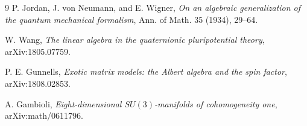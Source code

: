 \documentclass[11pt]{article}
\theoremstyle{definition}
\theoremstyle{remark}
\begin{document}
\begin{thebibliography}{9}
P. Jordan, J. von Neumann, and E. Wigner,
\emph{On an algebraic generalization of the quantum mechanical formalism},
Ann. of Math. 35 (1934), 29--64.

W. Wang,
\emph{The linear algebra in the quaternionic pluripotential theory},
arXiv:1805.07759.

P. E. Gunnells,
\emph{Exotic matrix models: the Albert algebra and the spin factor},
arXiv:1808.02853.

A. Gambioli,
\emph{Eight-dimensional $SU(3)$-manifolds of cohomogeneity one},
arXiv:math/0611796.
\end{thebibliography}
\end{document}
